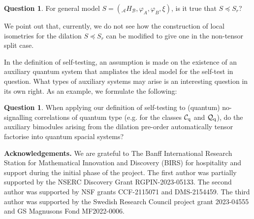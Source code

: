 \documentclass[11pt]{amsart}
\theoremstyle{definition}
\newtheorem{question}[theorem]{Question}
\newcommand{\cl}[1]{\mathcal{#1}}
\begin{document}
\begin{question}
For general model $S=(_{\cl A}H_{\cl B}, \varphi_A, \varphi_B, \xi)$, 
is it true that $S\preceq S_r$?
\end{question}

We point out that, currently, 
we do not see how the construction of local isometries for the dilation $S\preceq S_r$ can be modified to give one in the non-tensor split case. 

In the definition of self-testing, an assumption is made on 
the existence of an auxiliary quantum system that ampliates the ideal 
model for the self-test in question. What types of auxiliary systems 
may arise is an interesting question in its own right. As an example, 
we formulate the following:

\begin{question} 
When applying our definition of self-testing to (quantum) no-signalling correlations of quantum type (e.g. for the classes $\mathcal{C}_{\rm q}$ and 
$\mathcal{Q}_{\rm q}$), do the auxiliary bimodules arising from the dilation 
pre-order automatically tensor factorise into quantum spacial systems? 
\end{question}





\medskip


\noindent 
{\bf Acknowledgements. } 
We are grateful to The Banff International Research Station for Mathematical Innovation and Discovery (BIRS) for hospitality and support during the initial phase of the project. The first author was partially supported by the NSERC Discovery Grant RGPIN-2023-05133. The second author was supported by NSF grants 
CCF-2115071 and DMS-2154459. The third author was supported by the Swedish Research Council project grant 2023-04555 and GS Magnusons Fond MF2022-0006. 



\end{document}
